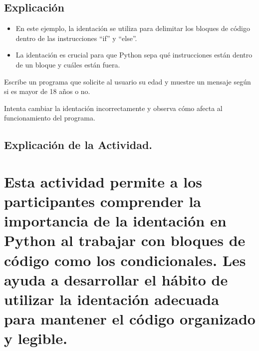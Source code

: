 \documentclass[
  a4paper,
  onepage,
  openany]{scrreprt}
\providecommand{\tightlist}{%
  \setlength{\itemsep}{0pt}\setlength{\parskip}{0pt}}\usepackage{longtable,booktabs,array}
\begin{document}
\hypertarget{explicaciuxf3n-6}{%
\section{Explicación}\label{explicaciuxf3n-6}}

\begin{itemize}
\tightlist
\item
  En este ejemplo, la identación se utiliza para delimitar los bloques
  de código dentro de las instrucciones ``if'' y ``else''.
\item
  La identación es crucial para que Python sepa qué instrucciones están
  dentro de un bloque y cuáles están fuera.
\end{itemize}

\begin{tcolorbox}[enhanced jigsaw, breakable, opacityback=0, toptitle=1mm, coltitle=black, toprule=.15mm, rightrule=.15mm, colframe=quarto-callout-important-color-frame, opacitybacktitle=0.6, arc=.35mm, title=\textcolor{quarto-callout-important-color}{\faExclamation}\hspace{0.5em}{Actividad Práctica:}, titlerule=0mm, colbacktitle=quarto-callout-important-color!10!white, bottomtitle=1mm, bottomrule=.15mm, colback=white, left=2mm, leftrule=.75mm]

Escribe un programa que solicite al usuario su edad y muestre un mensaje
según si es mayor de 18 años o no.

Intenta cambiar la identación incorrectamente y observa cómo afecta al
funcionamiento del programa.

\end{tcolorbox}

\hypertarget{explicaciuxf3n-de-la-actividad.}{%
\section{Explicación de la
Actividad.}\label{explicaciuxf3n-de-la-actividad.}}

\hypertarget{esta-actividad-permite-a-los-participantes-comprender-la-importancia-de-la-identaciuxf3n-en-python-al-trabajar-con-bloques-de-cuxf3digo-como-los-condicionales.-les-ayuda-a-desarrollar-el-huxe1bito-de-utilizar-la-identaciuxf3n-adecuada-para-mantener-el-cuxf3digo-organizado-y-legible.}{%
\chapter{Esta actividad permite a los participantes comprender la
importancia de la identación en Python al trabajar con bloques de código
como los condicionales. Les ayuda a desarrollar el hábito de utilizar la
identación adecuada para mantener el código organizado y
legible.}\label{esta-actividad-permite-a-los-participantes-comprender-la-importancia-de-la-identaciuxf3n-en-python-al-trabajar-con-bloques-de-cuxf3digo-como-los-condicionales.-les-ayuda-a-desarrollar-el-huxe1bito-de-utilizar-la-identaciuxf3n-adecuada-para-mantener-el-cuxf3digo-organizado-y-legible.}}
\end{document}
